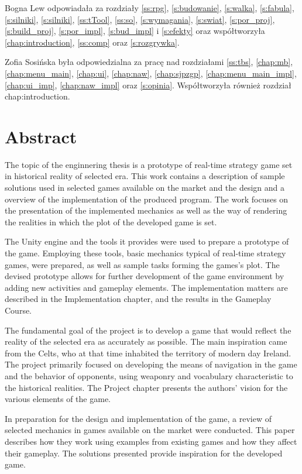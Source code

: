 Bogna Lew odpowiadała za rozdziały \ref{ss:rpg}, \ref{s:budowanie}, \ref{s:walka}, \ref{s:fabula}, \ref{s:silniki},
\ref{s:silniki}, \ref{ss:tTool}, \ref{ss:so}, \ref{s:wymagania}, \ref{s:swiat}, \ref{s:por_proj}, \ref{s:build_proj},
\ref{s:por_impl}, \ref{s:bud_impl} i \ref{s:efekty} oraz współtworzyła \ref{chap:introduction}, \ref{ss:comp} oraz \ref{s:rozgrywka}.

Zofia Sosińska była odpowiedzialna za
pracę nad rozdziałami \ref{ss:tbs}, \ref{chap:mb}, \ref{chap:menu_main}, \ref{chap:ui}, \ref{chap:naw}, \ref{chap:sjpzgp},
\ref{chap:menu_main_impl}, \ref{chap:ui_imp}, \ref{chap:naw_impl} oraz \ref{s:opinia}. Współtworzyła również rozdział {chap:introduction}.

\chapter*{Abstract}
The topic of the enginnering thesis is a prototype of real-time strategy game set in historical reality of selected era.
This work contains a description of sample solutions used in selected games available on the market
and the design and a overview of the implementation of the produced program. The work focuses on the presentation 
of the implemented mechanics as well as
the way of rendering the realities in which the plot of the developed game is set.

The Unity engine and the tools it provides were used to prepare a prototype of the game.
Employing these tools, basic mechanics typical of real-time strategy games, were prepared,
as well as sample tasks forming the games's plot. The devised prototype allows for 
further development of the game environment by adding new activities and gameplay elements.
The implementation matters are described in the Implementation chapter, and the results in the Gameplay Course.

The fundamental goal of the project is to develop a game that would reflect the reality of the selected era as accurately as possible.
The main inspiration came from the Celts, who at that time inhabited the territory of modern day Ireland. 
The project primarily focused on
developing the means of navigation in the game and the behavior of opponents, using weaponry and vocabulary characteristic to the
historical realities. The Project chapter presents the authors' vision for the various elements of the game.

In preparation for the design and implementation of the game, a review of selected mechanics in games available
on the market were conducted. This paper describes how they work using examples from existing games and how
they affect their gameplay. The solutions presented provide inspiration for the developed game.
